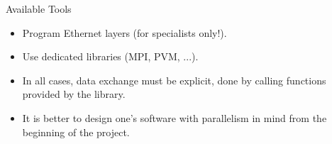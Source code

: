\documentclass[compress,10pt,aspectratio=169]{beamer}
\begin{document}
\begin{frame}[fragile]{Available Tools}

    \begin{itemize}
        \item Program Ethernet layers (for specialists only!).
        \item Use dedicated libraries (MPI, PVM, ...).
        \item In all cases, data exchange must be explicit, done by calling functions provided by the library.
        \item It is better to design one's software with parallelism in mind from the beginning of the project.
    \end{itemize}
\end{frame}
\end{document}
